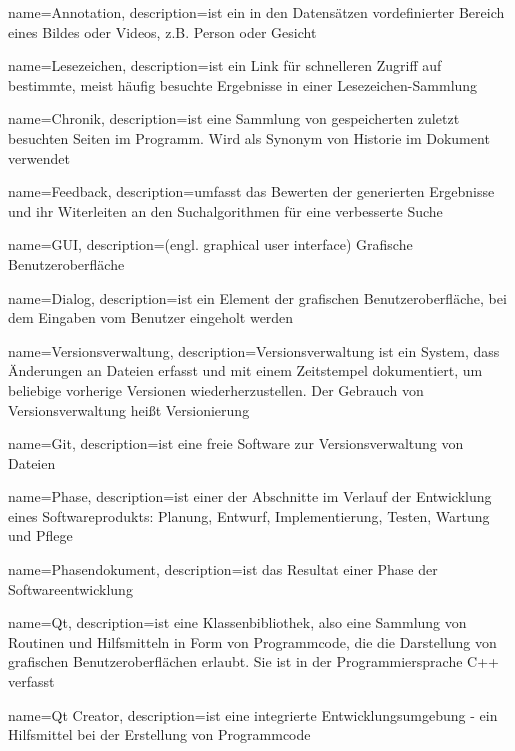 {
name=Annotation,
description={ist ein in den Datensätzen vordefinierter Bereich eines Bildes oder Videos, z.B. Person oder Gesicht}
}

{
name=Lesezeichen,
description={ist ein Link für schnelleren Zugriff auf bestimmte, meist häufig besuchte Ergebnisse in einer Lesezeichen-Sammlung}
}

{
name=Chronik,
description={ist eine Sammlung von gespeicherten zuletzt besuchten Seiten im Programm. \newline Wird als Synonym von Historie im Dokument verwendet}
}

{
name=Feedback,
description={umfasst das Bewerten der generierten Ergebnisse und ihr Witerleiten an den Suchalgorithmen für eine verbesserte Suche}
}



{
name=GUI,
description={(engl. graphical user interface) Grafische Benutzeroberfläche}
}

{
name=Dialog,
description={ist ein Element der grafischen Benutzeroberfläche, bei dem Eingaben vom Benutzer eingeholt werden}
}

{
name=Versionsverwaltung,
description={Versionsverwaltung ist ein System, dass Änderungen an Dateien erfasst und mit einem Zeitstempel dokumentiert, um beliebige vorherige Versionen wiederherzustellen. Der Gebrauch von Versionsverwaltung heißt Versionierung}
}

{
name=Git,
description={ist eine freie Software zur Versionsverwaltung von Dateien}
}

{
name=Phase,
description={ist einer der Abschnitte im Verlauf der Entwicklung eines Softwareprodukts: Planung, Entwurf, Implementierung, Testen, Wartung und Pflege}
}

{
name=Phasendokument,
description={ist das Resultat einer Phase der Softwareentwicklung}
}

{
name=Qt,
description={ist eine Klassenbibliothek, also eine Sammlung von Routinen und Hilfsmitteln in Form von Programmcode, die die Darstellung von grafischen Benutzeroberflächen erlaubt. Sie ist in der Programmiersprache C++ verfasst}
}

{
name=Qt Creator,
description={ist eine integrierte Entwicklungsumgebung - ein Hilfsmittel bei der Erstellung von Programmcode}
}

